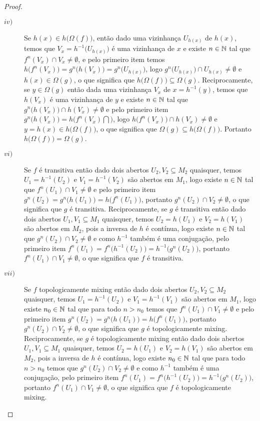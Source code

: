 \begin{proof}
\begin{description}
\item[$iv)$] Se $h(x)\in h\big(\Omega(f)\big)$, então dado uma vizinhança $U_{h(x)}$ de $h(x)$, temos que $V_x=h^{-1}\big(U_{h(x)}\big)$ é uma vizinhança de $x$ e existe $n\in\mathbb{N}$ tal que $f^n(V_x)\cap V_x\neq\emptyset$, e pelo primeiro item temos $h\big(f^n(V_x)\big)=g^n\big(h(V_x)\big)=g^n\big(U_{h(x)}\big)$, logo $g^n\big(U_{h(x)}\big)\cap U_{h(x)}\neq\emptyset$ e $h(x)\in\Omega(g)$, o que significa que $h\big(\Omega(f)\big)\subseteq\Omega(g)$. Reciprocamente, se $y\in\Omega(g)$ então dada uma vizinhança $V_x$ de $x=h^{-1}(y)$, temos que $h(V_x)$ é uma vizinhança de $y$ e existe $n\in\mathbb{N}$ tal que $g^{n}\big(h(V_x)\big)\cap h(V_x)\neq\emptyset$ e pelo primeiro item $g^{n}\big(h(V_x)\big)=h\big(f^n(V_x)\bigcap)$, logo $h\big(f^n(V_x)\big)\cap h(V_x)\neq\emptyset$ e $y=h(x)\in h\big(\Omega(f)\big)$, o que significa que $\Omega(g)\subseteq h\big(\Omega(f)\big)$. Portanto $h\big(\Omega(f)\big)=\Omega(g)$.

\item[$vi)$] Se $f$ é transitiva então dado dois abertos $U_2,V_2\subseteq M_2$ quaisquer, temos $U_1=h^{-1}(U_2)$ e $V_1=h^{-1}(V_2)$ são abertos em $M_1$, logo existe $n\in\mathbb{N}$ tal que $f^n(U_1)\cap V_1\neq\emptyset$ e pelo primeiro item $g^n(U_2)=g^n\big(h(U_1)\big)=h\big(f^n(U_1)\big)$, portanto $g^{n}(U_2)\cap V_2\neq\emptyset$, o que significa que $g$ é transitiva. Reciprocamente, se $g$ é transitiva então dado dois abertos $U_1,V_1\subseteq M_1$ quaisquer, temos $U_2=h(U_1)$ e $V_2=h(V_1)$ são abertos em $M_2$, pois a inversa de $h$ é contínua, logo existe $n\in\mathbb{N}$ tal que $g^n(U_2)\cap V_2\neq\emptyset$ e como $h^{-1}$ também é uma conjugação, pelo primeiro item $f^n(U_1)=f^n\big(h^{-1}(U_2)\big)=h^{-1}\big(g^n(U_2)\big)$, portanto $f^{n}(U_1)\cap V_1\neq\emptyset$, o que significa que $f$ é transitiva.

\item[$vii)$] Se $f$ topologicamente mixing então dado dois abertos $U_2,V_2\subseteq M_2$ quaisquer, temos $U_1=h^{-1}(U_2)$ e $V_1=h^{-1}(V_1)$ são abertos em $M_1$, logo existe $n_0\in\mathbb{N}$ tal que para todo $n>n_0$ temos que $f^n(U_1)\cap V_1\neq\emptyset$ e pelo primeiro item $g^n(U_2)=g^n\big(h(U_1)\big)=h\big(f^n(U_1)\big)$, portanto $g^{n}(U_2)\cap V_2\neq\emptyset$, o que significa que $g$ é topologicamente mixing. Reciprocamente, se $g$ é topologicamente mixing então dado dois abertos $U_1,V_1\subseteq M_1$ quaisquer, temos $U_2=h(U_1)$ e $V_2=h(V_1)$ são abertos em $M_2$, pois a inversa de $h$ é contínua, logo existe $n_0\in\mathbb{N}$ tal que para todo $n>n_0$ temos que $g^n(U_2)\cap V_2\neq\emptyset$ e como $h^{-1}$ também é uma conjugação, pelo primeiro item $f^n(U_1)=f^n\big(h^{-1}(U_2)\big)=h^{-1}\big(g^n(U_2)\big)$, portanto $f^{n}(U_1)\cap V_1\neq\emptyset$, o que significa que $f$ é topologicamente mixing.
\end{description}
\end{proof}

